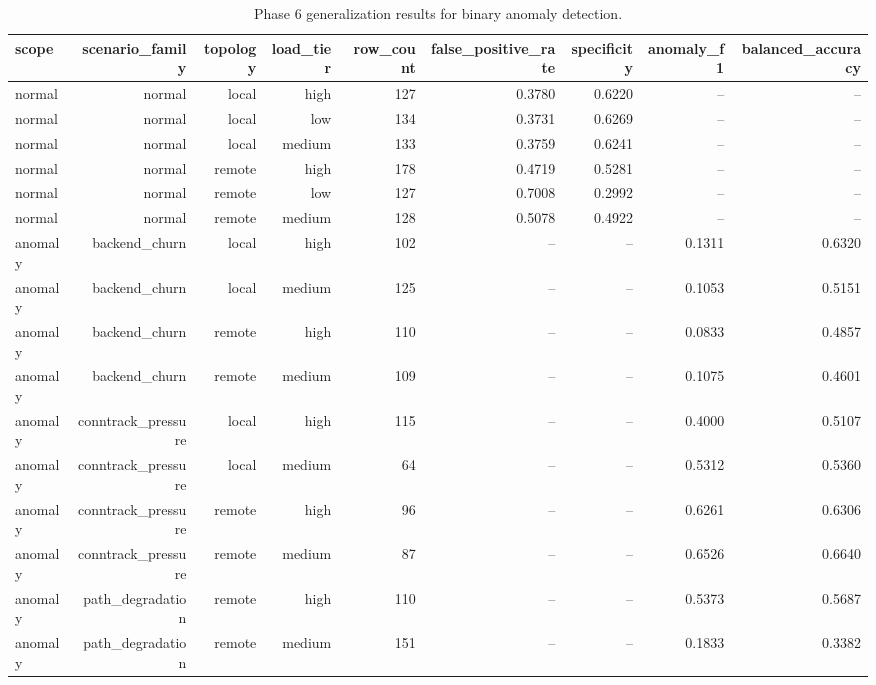 \begin{table}[t]
\centering
\caption{Phase 6 generalization results for binary anomaly detection.}
\label{tab:phase6_generalization_binary}
\begin{tabular}{lrrrrrrrr}
\hline
scope & scenario\_family & topology & load\_tier & row\_count & false\_positive\_rate & specificity & anomaly\_f1 & balanced\_accuracy \\
\hline
normal & normal & local & high & 127 & 0.3780 & 0.6220 & -- & -- \\
normal & normal & local & low & 134 & 0.3731 & 0.6269 & -- & -- \\
normal & normal & local & medium & 133 & 0.3759 & 0.6241 & -- & -- \\
normal & normal & remote & high & 178 & 0.4719 & 0.5281 & -- & -- \\
normal & normal & remote & low & 127 & 0.7008 & 0.2992 & -- & -- \\
normal & normal & remote & medium & 128 & 0.5078 & 0.4922 & -- & -- \\
anomaly & backend\_churn & local & high & 102 & -- & -- & 0.1311 & 0.6320 \\
anomaly & backend\_churn & local & medium & 125 & -- & -- & 0.1053 & 0.5151 \\
anomaly & backend\_churn & remote & high & 110 & -- & -- & 0.0833 & 0.4857 \\
anomaly & backend\_churn & remote & medium & 109 & -- & -- & 0.1075 & 0.4601 \\
anomaly & conntrack\_pressure & local & high & 115 & -- & -- & 0.4000 & 0.5107 \\
anomaly & conntrack\_pressure & local & medium & 64 & -- & -- & 0.5312 & 0.5360 \\
anomaly & conntrack\_pressure & remote & high & 96 & -- & -- & 0.6261 & 0.6306 \\
anomaly & conntrack\_pressure & remote & medium & 87 & -- & -- & 0.6526 & 0.6640 \\
anomaly & path\_degradation & remote & high & 110 & -- & -- & 0.5373 & 0.5687 \\
anomaly & path\_degradation & remote & medium & 151 & -- & -- & 0.1833 & 0.3382 \\
\hline
\end{tabular}
\end{table}
